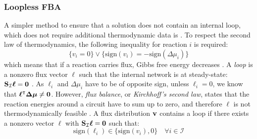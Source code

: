 \newpage
\subsubsection{Loopless FBA} \label{section:ll_fba}
A simpler method to ensure that a solution does not contain an internal loop, which does not require additional thermodynamic data is . 
To respect the second law of thermodynamics, the following inequality for reaction $i$ is required: 
\begin{equation}
    \{v_i = 0\} \lor \{\text{sign}(v_i) = - \text{sign}(\Delta \mu_i)\} 
\end{equation}
\quad which means that if a reaction carries flux, Gibbs free energy decreases \cite{muller_fast_2013}. 
A \textit{loop} is a nonzero flux vector $\boldsymbol \ell$ such that the internal network is at steady-state: $\bold S_{\mathcal{I}} \boldsymbol \ell = \bold 0$ \cite{noor_proof_2012}. As $\ell_i$ and $\Delta \mu_i$ have to be of opposite sign, unless $\ell_i=0$, we know that $\boldsymbol \ell^\intercal \boldsymbol{\Delta \mu} \neq \bold 0$. %
However, \textit{flux balance}, or \textit{Kirchhoff's second law}, states that the reaction energies around a circuit have to sum up to zero, and therefore $\boldsymbol \ell$ is not thermodynamically feasible \cite{elimination_infeasible_loops}. 
A flux distribution $\bold v$ contains a loop if there exists a nonzero vector $\boldsymbol \ell$ with $\bold S_{\mathcal{I}} \boldsymbol \ell = \bold 0$ such that: %
\begin{equation*}
    \text{sign}(\ell_i) \in \{\text{sign}(v_i),0\} \quad \forall i \in \mathcal{I}
\end{equation*}

